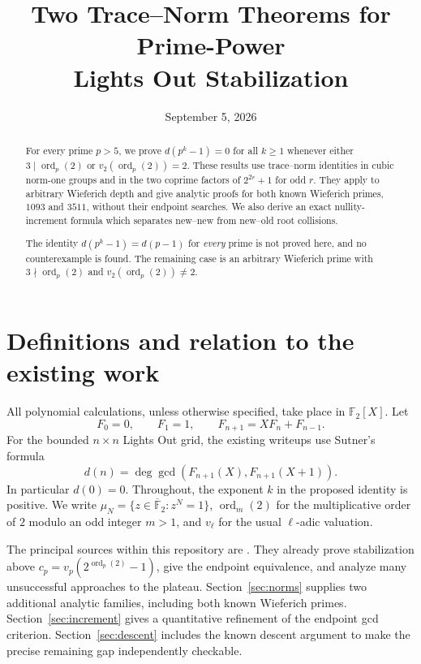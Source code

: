 \documentclass[a4paper]{article}
\title{Two Trace--Norm Theorems for Prime-Power\\
Lights Out Stabilization}
\author{}
\date{September 5, 2026}
\newcommand{\F}{\mathbb F}
\newcommand{\ord}{\operatorname{ord}}
\begin{document}
\maketitle

\begin{abstract}
For every prime $p>5$, we prove $d(p^k-1)=0$ for all $k\geq1$
whenever either $3\mid\ord_p(2)$ or $v_2(\ord_p(2))=2$.
These results use trace--norm identities in cubic norm-one groups and
in the two coprime factors of $2^{2r}+1$ for odd $r$.
They apply to arbitrary Wieferich depth and give analytic proofs for
both known Wieferich primes, $1093$ and $3511$, without their endpoint
searches.  We also derive an exact nullity-increment formula which
separates new--new from new--old root collisions.

The identity $d(p^k-1)=d(p-1)$ for \emph{every} prime is not proved
here, and no counterexample is found.  The remaining case is an
arbitrary Wieferich prime with
$3\nmid\ord_p(2)$ and $v_2(\ord_p(2))\ne2$.
\end{abstract}

\section{Definitions and relation to the existing work}

All polynomial calculations, unless otherwise specified, take place in
$\F_2[X]$.  Let
\[
 F_0=0,\qquad F_1=1,\qquad F_{n+1}=XF_n+F_{n-1}.
\]
For the bounded $n\times n$ Lights Out grid, the existing writeups use
Sutner's formula
\begin{equation}\label{eq:nullity}
 d(n)=\deg\gcd(F_{n+1}(X),F_{n+1}(X+1)).
\end{equation}
In particular $d(0)=0$.  Throughout, the exponent $k$ in the proposed
identity is positive.
We write $\mu_N=\{z\in\overline{\F}_2:z^N=1\}$,
$\ord_m(2)$ for the multiplicative order of $2$ modulo an odd integer
$m>1$, and $v_\ell$ for the usual $\ell$-adic valuation.

The principal sources within this repository are
\cite{finite-fields,plateau}.  They already prove stabilization above
$c_p=v_p(2^{\ord_p(2)}-1)$, give the endpoint equivalence, and analyze
many unsuccessful approaches to the plateau.
Section~\ref{sec:norms} supplies two additional analytic families,
including both known Wieferich primes.
Section~\ref{sec:increment} gives a quantitative refinement of the
endpoint gcd criterion.  Section~\ref{sec:descent} includes the known
descent argument to make the precise remaining gap independently
checkable.
\end{document}
